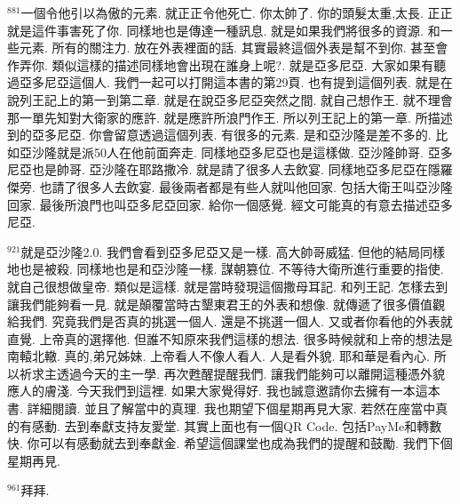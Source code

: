\documentclass{book}
\begin{document}
$^{881}$一個令他引以為傲的元素.
就正正令他死亡.
你太帥了.
你的頭髮太重,太長.
正正就是這件事害死了你.
同樣地也是傳達一種訊息.
就是如果我們將很多的資源.
和一些元素.
所有的關注力.
放在外表裡面的話.
其實最終這個外表是幫不到你.
甚至會作弄你.
類似這樣的描述同樣地會出現在誰身上呢?.
就是亞多尼亞.
大家如果有聽過亞多尼亞這個人.
我們一起可以打開這本書的第29頁.
也有提到這個列表.
就是在說列王記上的第一到第二章.
就是在說亞多尼亞突然之間.
就自己想作王.
就不理會那一單先知對大衛家的應許.
就是應許所浪門作王.
所以列王記上的第一章.
所描述到的亞多尼亞.
你會留意透過這個列表.
有很多的元素.
是和亞沙隆是差不多的.
比如亞沙隆就是派50人在他前面奔走.
同樣地亞多尼亞也是這樣做.
亞沙隆帥哥.
亞多尼亞也是帥哥.
亞沙隆在耶路撒冷.
就是請了很多人去飲宴.
同樣地亞多尼亞在隱羅傑旁.
也請了很多人去飲宴.
最後兩者都是有些人就叫他回家.
包括大衛王叫亞沙隆回家.
最後所浪門也叫亞多尼亞回家.
給你一個感覺.
經文可能真的有意去描述亞多尼亞.

$^{921}$就是亞沙隆2.0.
我們會看到亞多尼亞又是一樣.
高大帥哥威猛.
但他的結局同樣地也是被殺.
同樣地也是和亞沙隆一樣.
謀朝篡位.
不等待大衛所進行重要的指使.
就自己很想做皇帝.
類似是這樣.
就是當時發現這個撒母耳記.
和列王記.
怎樣去到讓我們能夠看一見.
就是顛覆當時古墾東君王的外表和想像.
就傳遞了很多價值觀給我們.
究竟我們是否真的挑選一個人.
還是不挑選一個人.
又或者你看他的外表就直覺.
上帝真的選擇他.
但誰不知原來我們這樣的想法.
很多時候就和上帝的想法是南轅北轍.
真的,弟兄姊妹.
上帝看人不像人看人.
人是看外貌.
耶和華是看內心.
所以祈求主透過今天的主一學.
再次甦醒提醒我們.
讓我們能夠可以離開這種憑外貌應人的膚淺.
今天我們到這裡.
如果大家覺得好.
我也誠意邀請你去擁有一本這本書.
詳細閱讀.
並且了解當中的真理.
我也期望下個星期再見大家.
若然在座當中真的有感動.
去到奉獻支持友愛堂.
其實上面也有一個QR Code.
包括PayMe和轉數快.
你可以有感動就去到奉獻金.
希望這個課堂也成為我們的提醒和鼓勵.
我們下個星期再見.

$^{961}$拜拜.
\newpage
\end{document}
